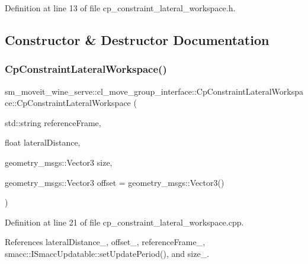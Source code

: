 Definition at line 13 of file cp\+\_\+constraint\+\_\+lateral\+\_\+workspace.\+h.



\subsection{Constructor \& Destructor Documentation}
\mbox{\label{classsm__moveit__wine__serve_1_1cl__move__group__interface_1_1CpConstraintLateralWorkspace_abf58ad942605893fd6b76c21c8dcbae1}} 
\subsubsection{\texorpdfstring{Cp\+Constraint\+Lateral\+Workspace()}{CpConstraintLateralWorkspace()}}
{\footnotesize\ttfamily sm\+\_\+moveit\+\_\+wine\+\_\+serve\+::cl\+\_\+move\+\_\+group\+\_\+interface\+::\+Cp\+Constraint\+Lateral\+Workspace\+::\+Cp\+Constraint\+Lateral\+Workspace (\begin{DoxyParamCaption}\item[{std\+::string}]{reference\+Frame,  }\item[{float}]{lateral\+Distance,  }\item[{geometry\+\_\+msgs\+::\+Vector3}]{size,  }\item[{geometry\+\_\+msgs\+::\+Vector3}]{offset = {\ttfamily geometry\+\_\+msgs\+:\+:Vector3()} }\end{DoxyParamCaption})}



Definition at line 21 of file cp\+\_\+constraint\+\_\+lateral\+\_\+workspace.\+cpp.



References lateral\+Distance\+\_\+, offset\+\_\+, reference\+Frame\+\_\+, smacc\+::\+I\+Smacc\+Updatable\+::set\+Update\+Period(), and size\+\_\+.


